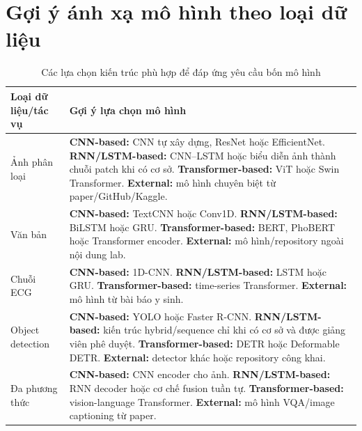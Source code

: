 \documentclass[12pt,a4paper,oneside]{report}
\begin{document}
\chapter{Gợi ý ánh xạ mô hình theo loại dữ liệu}
\begin{table}[H]
\centering
\caption{Các lựa chọn kiến trúc phù hợp để đáp ứng yêu cầu bốn mô hình}
\begin{tabularx}{\textwidth}{@{}L{3.5cm}Y@{}}
\toprule
\textbf{Loại dữ liệu/tác vụ} & \textbf{Gợi ý lựa chọn mô hình} \\
\midrule
Ảnh phân loại &
\textbf{CNN-based:} CNN tự xây dựng, ResNet hoặc EfficientNet.\newline
\textbf{RNN/LSTM-based:} CNN--LSTM hoặc biểu diễn ảnh thành chuỗi patch khi có cơ sở.\newline
\textbf{Transformer-based:} ViT hoặc Swin Transformer.\newline
\textbf{External:} mô hình chuyên biệt từ paper/GitHub/Kaggle. \\
\addlinespace
Văn bản &
\textbf{CNN-based:} TextCNN hoặc Conv1D.\newline
\textbf{RNN/LSTM-based:} BiLSTM hoặc GRU.\newline
\textbf{Transformer-based:} BERT, PhoBERT hoặc Transformer encoder.\newline
\textbf{External:} mô hình/repository ngoài nội dung lab. \\
\addlinespace
Chuỗi ECG &
\textbf{CNN-based:} 1D-CNN.\newline
\textbf{RNN/LSTM-based:} LSTM hoặc GRU.\newline
\textbf{Transformer-based:} time-series Transformer.\newline
\textbf{External:} mô hình từ bài báo y sinh. \\
\addlinespace
Object detection &
\textbf{CNN-based:} YOLO hoặc Faster R-CNN.\newline
\textbf{RNN/LSTM-based:} kiến trúc hybrid/sequence chỉ khi có cơ sở và được giảng viên phê duyệt.\newline
\textbf{Transformer-based:} DETR hoặc Deformable DETR.\newline
\textbf{External:} detector khác hoặc repository công khai. \\
\addlinespace
Đa phương thức &
\textbf{CNN-based:} CNN encoder cho ảnh.\newline
\textbf{RNN/LSTM-based:} RNN decoder hoặc cơ chế fusion tuần tự.\newline
\textbf{Transformer-based:} vision-language Transformer.\newline
\textbf{External:} mô hình VQA/image captioning từ paper. \\
\bottomrule
\end{tabularx}
\end{table}
\end{document}
